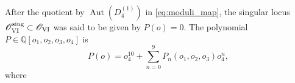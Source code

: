 \documentclass[a4paper,reqno]{amsart}
\numberwithin{equation}{section}
\numberwithin{equation}{section}
\begin{document}
After the quotient by $\operatorname{Aut}(D_4^{(1)})$ in \cref{eq:moduli_map}, the singular locus $\mathscr{O}^{\operatorname{sing}}_{\rm{VI}}\subset\mathscr{O}_{\rm{VI}}$ was said to be given by $P(o)=0$. The polynomial $P\in \mathbb{Q}[o_1,o_2,o_3,o_4]$ is 
\begin{equation*}
    P(o)= o_4^{10} + \sum_{n=0}^{9}P_n(o_1,o_2,o_3)o_4^{n},
\end{equation*}
where 
\end{document}
